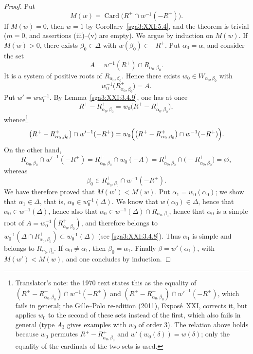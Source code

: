 \begin{proof}
Put
\[
 M(w)=\operatorname{Card}\bigl(R^+\cap w^{-1}(-R^+)\bigr).
\]
If \(M(w)=0\), then \(w=1\) by Corollary~\ref{sga3:XXI:5.4}, and the
theorem is trivial (\(m=0\), and assertions (iii)--(v) are empty). We
argue by induction on \(M(w)\). If \(M(w)>0\), there exists
\(\beta_0\in\Delta\) with \(w(\beta_0)\in-R^+\). Put
\(\alpha_0=\alpha\), and consider the set
\[
 A=w^{-1}(R^+)\cap R_{\alpha_0,\beta_0}.
\]
It is a system of positive roots of \(R_{\alpha_0,\beta_0}\). Hence
there exists \(w_0\in W_{\alpha_0,\beta_0}\) with
\[
 w_0^{-1}\bigl(R^+_{\alpha_0,\beta_0}\bigr)=A.
\]
Put \(w'=ww_0^{-1}\). By Lemma~\ref{sga3:XXI:3.4.9}, one has at once
\[
 R^+-R^+_{\alpha_0,\beta_0}=w_0\bigl(R^+-R^+_{\alpha_0,\beta_0}\bigr),
\]
whence\footnote{Translator's note: the 1970 text states this as the equality of
\((R^+-R^+_{\alpha_0,\beta_0})\cap w^{-1}(-R^+)\) and
\((R^+-R^+_{\alpha_0,\beta_0})\cap w'^{-1}(-R^+)\), which fails in general; the
Gille--Polo re-edition (2011), Exposé~XXI, corrects it, but applies \(w_0\) to the second
of these sets instead of the first, which also fails in general (type \(A_3\) gives
examples with \(w_0\) of order \(3\)). The relation above holds because \(w_0\) permutes
\(R^+-R^+_{\alpha_0,\beta_0}\) and \(w'(w_0(\delta))=w(\delta)\); only the equality of
the cardinals of the two sets is used.}
\[
 \bigl(R^+-R^+_{\alpha_0,\beta_0}\bigr)\cap w'^{-1}(-R^+)
 =w_0\Bigl(\bigl(R^+-R^+_{\alpha_0,\beta_0}\bigr)\cap w^{-1}(-R^+)\Bigr).
\]
On the other hand,
\[
 R^+_{\alpha_0,\beta_0}\cap w'^{-1}(-R^+)
 =R^+_{\alpha_0,\beta_0}\cap w_0(-A)
 =R^+_{\alpha_0,\beta_0}\cap\bigl(-R^+_{\alpha_0,\beta_0}\bigr)=\varnothing,
\]
whereas
\[
 \beta_0\in R^+_{\alpha_0,\beta_0}\cap w^{-1}(-R^+).
\]
We have therefore proved that \(M(w')<M(w)\). Put
\(\alpha_1=w_0(\alpha_0)\); we show that \(\alpha_1\in\Delta\), that is,
\(\alpha_0\in w_0^{-1}(\Delta)\). We know that \(w(\alpha_0)\in\Delta\),
hence that \(\alpha_0\in w^{-1}(\Delta)\), hence also that
\(\alpha_0\in w^{-1}(\Delta)\cap R_{\alpha_0,\beta_0}\), hence that
\(\alpha_0\) is a simple root of
\(A=w_0^{-1}(R^+_{\alpha_0,\beta_0})\), and therefore belongs to
\(w_0^{-1}(\Delta\cap R^+_{\alpha_0,\beta_0})\subset w_0^{-1}(\Delta)\)
(see \ref{sga3:XXI:3.4.8}). Thus \(\alpha_1\) is simple and belongs to
\(R_{\alpha_0,\beta_0}\). If \(\alpha_0\neq\alpha_1\), then
\(\beta_0=\alpha_1\). Finally \(\beta=w'(\alpha_1)\), with
\(M(w')<M(w)\), and one concludes by induction.
\end{proof}
